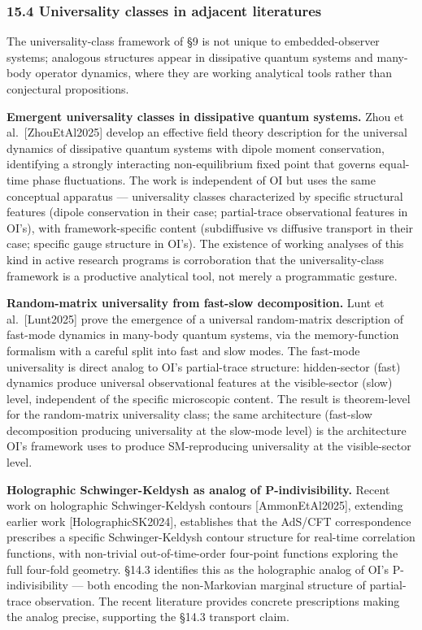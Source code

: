 \documentclass[
]{article}
\begin{document}
\hypertarget{universality-classes-in-adjacent-literatures}{%
\subsubsection{15.4 Universality classes in adjacent
literatures}\label{universality-classes-in-adjacent-literatures}}

The universality-class framework of §9 is not unique to
embedded-observer systems; analogous structures appear in dissipative
quantum systems and many-body operator dynamics, where they are working
analytical tools rather than conjectural propositions.

\textbf{Emergent universality classes in dissipative quantum systems.}
Zhou et al.~{[}ZhouEtAl2025{]} develop an effective field theory
description for the universal dynamics of dissipative quantum systems
with dipole moment conservation, identifying a strongly interacting
non-equilibrium fixed point that governs equal-time phase fluctuations.
The work is independent of OI but uses the same conceptual apparatus ---
universality classes characterized by specific structural features
(dipole conservation in their case; partial-trace observational features
in OI's), with framework-specific content (subdiffusive vs diffusive
transport in their case; specific gauge structure in OI's). The
existence of working analyses of this kind in active research programs
is corroboration that the universality-class framework is a productive
analytical tool, not merely a programmatic gesture.

\textbf{Random-matrix universality from fast-slow decomposition.} Lunt
et al.~{[}Lunt2025{]} prove the emergence of a universal random-matrix
description of fast-mode dynamics in many-body quantum systems, via the
memory-function formalism with a careful split into fast and slow modes.
The fast-mode universality is direct analog to OI's partial-trace
structure: hidden-sector (fast) dynamics produce universal observational
features at the visible-sector (slow) level, independent of the specific
microscopic content. The result is theorem-level for the random-matrix
universality class; the same architecture (fast-slow decomposition
producing universality at the slow-mode level) is the architecture OI's
framework uses to produce SM-reproducing universality at the
visible-sector level.

\textbf{Holographic Schwinger-Keldysh as analog of P-indivisibility.}
Recent work on holographic Schwinger-Keldysh contours
{[}AmmonEtAl2025{]}, extending earlier work {[}HolographicSK2024{]},
establishes that the AdS/CFT correspondence prescribes a specific
Schwinger-Keldysh contour structure for real-time correlation functions,
with non-trivial out-of-time-order four-point functions exploring the
full four-fold geometry. §14.3 identifies this as the holographic analog
of OI's P-indivisibility --- both encoding the non-Markovian marginal
structure of partial-trace observation. The recent literature provides
concrete prescriptions making the analog precise, supporting the §14.3
transport claim.
\end{document}
